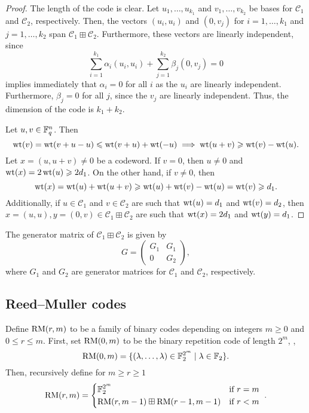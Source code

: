 \documentclass[../main.tex]{subfiles}
\begin{document}
\begin{proof}
The length of the code is clear. Let $u_1, \dots, u_{k_1}$ and $v_1, \dots, v_{k_2}$ be bases for $\mathcal{C}_1$ and $\mathcal{C}_2$, respectively. Then, the vectors $(u_i, u_i)$ and $(0, v_j)$ for $i = 1, \dots, k_1$ and $j = 1, \dots, k_2$ span $\mathcal{C}_1 \boxplus \mathcal{C}_2$. Furthermore, these vectors are linearly independent, since
\begin{equation*}
    \sum_{i=1}^{k_1} \alpha_i (u_i, u_i) + \sum_{j=1}^{k_2} \beta_j (0, v_j) = 0
\end{equation*}
implies immediately that $\alpha_i = 0$ for all $i$ as the $u_i$ are linearly independent. Furthermore, $\beta_j = 0$ for all $j$, since the $v_j$ are linearly independent. Thus, the dimension of the code is $k_1 + k_2$.

Let $u, v \in \mathbb{F}_q^n$. Then
\begin{equation*}
    \operatorname{wt}(v) = \operatorname{wt}(v + u - u) \leqslant \operatorname{wt}(v + u) + \operatorname{wt}(-u) \implies \operatorname{wt}(u + v) \geqslant \operatorname{wt}(v) - \operatorname{wt}(u).
\end{equation*}
Let $x = (u, u + v) \neq 0$ be a codeword. If $v = 0$, then $u \neq 0$ and $\operatorname{wt}(x) = 2\operatorname{wt}(u) \geqslant 2d_1$. On the other hand, if $v \neq 0$, then
\begin{equation*}
    \operatorname{wt}(x) = \operatorname{wt}(u) + \operatorname{wt}(u + v) \geqslant \operatorname{wt}(u) + \operatorname{wt}(v) - \operatorname{wt}(u) = \operatorname{wt}(v) \geqslant d_1.
\end{equation*}
Additionally, if $u \in \mathcal{C}_1$ and $v \in \mathcal{C}_2$ are such that $\operatorname{wt}(u) = d_1$ and $\operatorname{wt}(v) = d_2$, then $x = (u, u), y = (0, v) \in \mathcal{C}_1 \boxplus \mathcal{C}_2$ are such that $\operatorname{wt}(x) = 2d_1$ and $\operatorname{wt}(y) = d_1$.
\end{proof}

The generator matrix of $\mathcal{C}_1 \boxplus \mathcal{C}_2$ is given by
\begin{equation*}
    G = \begin{pmatrix}
        G_1 & G_1 \\
        0 & G_2
    \end{pmatrix},
\end{equation*}
where $G_1$ and $G_2$ are generator matrices for $\mathcal{C}_1$ and $\mathcal{C}_2$, respectively.

\subsection{Reed--Muller codes}

Define $\operatorname{RM}(r, m)$ to be a family of binary codes depending on integers $m \geq 0$ and $0 \leq r \leq m$. First, set $\operatorname{RM}(0, m)$ to be the binary repetition code of length $2^m$, \ie,
\begin{equation*}
    \operatorname{RM}(0, m) = \{ (\lambda, \dots, \lambda) \in \mathbb{F}_2^{2^m} \mid \lambda \in \mathbb{F}_2 \}.
\end{equation*}
Then, recursively define for $m \geq r \geq 1$
\begin{equation*}
    \RM(r, m) = \begin{dcases*}
        \F_2^{2^m} & if $r = m$ \\
        \RM(r, m - 1) \boxplus \RM(r - 1, m - 1) & if $r < m$
    \end{dcases*}.
\end{equation*}
\end{document}
